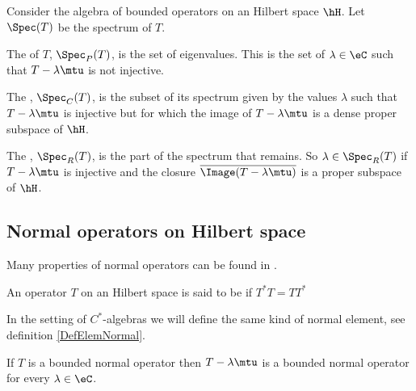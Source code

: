 \begin{definition}
    Consider the algebra of bounded operators on an Hilbert space \( \hH\). Let \( \Spec(T)\) be the spectrum of \( T\). 
    
    The  of \( T\), \( \Spec_P(T)\), is the set of eigenvalues. This is the set of \( \lambda\in\eC\) such that \( T-\lambda\mtu\) is not injective.

    The , \( \Spec_C(T)\), is the subset of its spectrum given by the values \( \lambda\) such that \( T-\lambda\mtu\) is injective but for which the image of \( T-\lambda\mtu\) is a dense proper subspace of \( \hH\).

    The , $\Spec_R(T)$, is the part of the spectrum that remains. So \( \lambda\in\Spec_R(T)\) if \( T-\lambda\mtu\) is injective and the closure \( \overline{ \Image(T-\lambda\mtu) }\) is a proper subspace of \( \hH\).
\end{definition}

\subsection{Normal operators on Hilbert space}

Many properties of normal operators can be found in \cite{AndrewGreen}.

\begin{definition}  \label{DefFQFKZbB}
    An operator \( T\) on an Hilbert space is said to be  if \( T^*T=TT^*\) 
\end{definition}
In the setting of \( C^*\)-algebras we will define the same kind of normal element, see definition \ref{DefElemNormal}. 

\begin{proposition}
    If \( T\) is a bounded normal operator then \( T-\lambda\mtu\) is a bounded normal operator for every \( \lambda\in\eC\).
\end{proposition}

